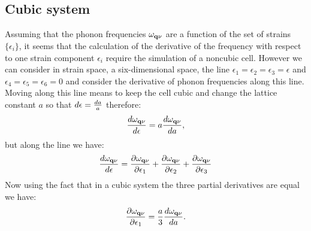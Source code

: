 \documentclass[12pt,a4paper]{article}
\begin{document}
\subsection{\color{web-blue}Cubic system}
Assuming that the phonon frequencies ${\omega}_{{\bf q}\nu}$ are a function 
of the set of strains $\{\epsilon_i\}$, it seems that the calculation of 
the derivative of the frequency with respect to one strain component 
$\epsilon_i$ require the simulation of a noncubic cell.  
However we can consider in strain space, a six-dimensional space, the line 
$\epsilon_1=\epsilon_2=\epsilon_3=\epsilon$ and 
$\epsilon_4=\epsilon_5=\epsilon_6=0$ and consider the derivative of phonon
frequencies along this line. Moving along this line means to keep the cell
cubic and change the lattice constant $a$ so that $d\epsilon={da \over a}$
therefore:
\begin{equation}
{d \omega_{{\bf q}\nu} \over d \epsilon} =a{d \omega_{{\bf q}\nu} \over d a},
\end{equation}
but along the line we have:
\begin{equation}
{d \omega_{{\bf q}\nu} \over d \epsilon} = {\partial \omega_{{\bf q}\nu} 
\over \partial \epsilon_1} + {\partial \omega_{{\bf q}\nu} 
\over \partial \epsilon_2} + {\partial \omega_{{\bf q}\nu} 
\over \partial \epsilon_3} 
\end{equation}
Now using the fact that in a cubic system the three partial derivatives 
are equal we have:
\begin{equation}
{\partial \omega_{{\bf q}\nu} 
\over \partial \epsilon_1} = {a \over 3} {d \omega_{{\bf q}\nu} \over d a}.
\end{equation}
\end{document}
